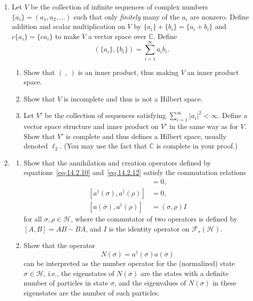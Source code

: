 
\chapterproblems

\begin{enumerate}[label=\arabic*.,leftmargin=2em,itemsep=1.2ex]
\item
Let \(V\) be the collection of infinite sequences of complex numbers
\(\{a_i\}=(a_1,a_2,\ldots)\) such that only \emph{finitely} many of the \(a_i\)
are nonzero. Define addition and scalar multiplication on \(V\) by
\(\{a_i\}+\{b_i\}=\{a_i+b_i\}\) and \(c\{a_i\}=\{ca_i\}\) to make \(V\) a
vector space over \(\mathbb C\). Define
\[
  (\{a_i\},\{b_i\})=\sum_{i=1}^{\infty}\overline a_i b_i.
\]
\begin{enumerate}[label=\alph*),leftmargin=2em,itemsep=.45ex]
\item Show that \((\ ,\ )\) is an inner product, thus making \(V\) an inner product
space.
\item Show that \(V\) is incomplete and thus is not a Hilbert space.
\item Let \(V'\) be the collection of sequences satisfying
\(\sum_{i=1}^{\infty}|a_i|^2<\infty\). Define a vector space structure and inner
product on \(V'\) in the same way as for \(V\). Show that \(V'\) is complete and
thus defines a Hilbert space, usually denoted \(\ell_2\). (You may use the fact that
\(\mathbb C\) is complete in your proof.)
\end{enumerate}

\item
\begin{enumerate}[label=\alph*),leftmargin=2em,itemsep=.45ex]
\item Show that the annihilation and creation operators defined by
equations~\eqref{eq:14.2.10} and~\eqref{eq:14.2.12} satisfy the commutation
relations
\begin{align*}
  [a(\overline{\sigma}),a(\rho)]&=0,\\
  [a^\dagger(\sigma),a^\dagger(\rho)]&=0,\\
  [a(\overline{\sigma}),a^\dagger(\rho)]&=(\sigma,\rho)I
\end{align*}
for all \(\sigma,\rho\in\mathcal H\), where the commutator of two operators is
defined by \([A,B]=AB-BA\), and \(I\) is the identity operator on
\(\mathcal F_s(\mathcal H)\).
\item Show that the operator
\[
  N(\sigma)=a^\dagger(\sigma)a(\overline{\sigma})
\]
can be interpreted as the number operator for the (normalized) state
\(\sigma\in\mathcal H\), i.e., the eigenstates of \(N(\sigma)\) are the states with
a definite number of particles in state \(\sigma\), and the eigenvalues of
\(N(\sigma)\) in these eigenstates are the number of such particles.
\end{enumerate}


\end{enumerate}
